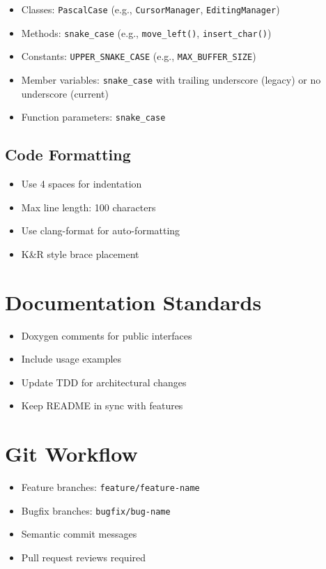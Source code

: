 \documentclass[12pt,a4paper,oneside,openany]{report}
\begin{document}
\begin{itemize}
	\item Classes: \texttt{PascalCase} (e.g., \texttt{CursorManager}, \texttt{EditingManager})
	\item Methods: \texttt{snake\_case} (e.g., \texttt{move\_left()}, \texttt{insert\_char()})
	\item Constants: \texttt{UPPER\_SNAKE\_CASE} (e.g., \texttt{MAX\_BUFFER\_SIZE})
	\item Member variables: \texttt{snake\_case} with trailing underscore (legacy) or no underscore (current)
	\item Function parameters: \texttt{snake\_case}
\end{itemize}

\subsection{Code Formatting}

\begin{itemize}
	\item Use 4 spaces for indentation
	\item Max line length: 100 characters
	\item Use clang-format for auto-formatting
	\item K\&R style brace placement
\end{itemize}

\section{Documentation Standards}

\begin{itemize}
	\item Doxygen comments for public interfaces
	\item Include usage examples
	\item Update TDD for architectural changes
	\item Keep README in sync with features
\end{itemize}

\section{Git Workflow}

\begin{itemize}
	\item Feature branches: \texttt{feature/feature-name}
	\item Bugfix branches: \texttt{bugfix/bug-name}
	\item Semantic commit messages
	\item Pull request reviews required
\end{itemize}
\end{document}

